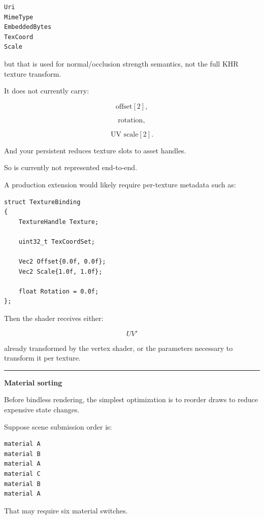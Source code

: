 \begin{verbatim}
Uri
MimeType
EmbeddedBytes
TexCoord
Scale
\end{verbatim}

but that  is used for normal/occlusion strength semantics, not the full KHR texture transform.

It does not currently carry:

\[
\text{offset}[2],
\]

\[
\text{rotation},
\]

\[
\text{UV scale}[2].
\]

And your persistent  reduces texture slots to asset handles.

So  is currently not represented end-to-end.

A production extension would likely require per-texture metadata such as:

\begin{verbatim}
struct TextureBinding
{
    TextureHandle Texture;

    uint32_t TexCoordSet;

    Vec2 Offset{0.0f, 0.0f};
    Vec2 Scale{1.0f, 1.0f};

    float Rotation = 0.0f;
};
\end{verbatim}

Then the shader receives either:

\[
UV'
\]

already transformed by the vertex shader, or the parameters necessary to transform it per texture.

\begin{center}\rule{0.5\linewidth}{0.5pt}\end{center}

\textbf{Material sorting}

Before bindless rendering, the simplest optimization is to reorder draws to reduce expensive state changes.

Suppose scene submission order is:

\begin{verbatim}
material A
material B
material A
material C
material B
material A
\end{verbatim}

That may require six material switches.

